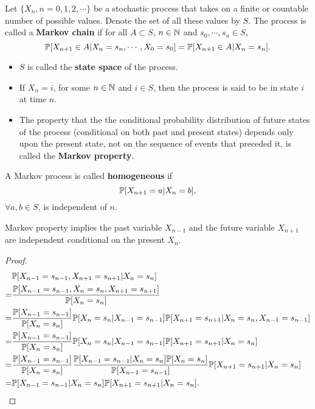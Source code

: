 \begin{definition}
    Let $\{X_n, n = 0, 1, 2, \cdots\}$ be a stochastic process that takes on a finite or countable number of possible values. Denote the set of all these values by $S$. The process is called a \textbf{Markov chain} if for all $A \subset S$, $n \in \mathbb{N}$ and $s_0, \cdots, s_n \in S$,
    $$\mathbb{P}[X_{n+1} \in A | X_n = s_n, \cdots, X_0 = s_0] = \mathbb{P}[X_{n+1} \in A | X_n = s_n].$$
\end{definition}

\begin{itemize}
    \item $S$ is called the \textbf{state space} of the process.
    \item If $X_n = i$, for some $n \in \mathbb{N}$ and $i \in S$, then the process is said to be in state $i$ at time $n$.
    \item The property that the the conditional probability distribution of future states of the process (conditional on both past and present states) depends only upon the present state, not on the sequence of events that preceded it, is called the \textbf{Markov property}.
\end{itemize}

\begin{definition}[Homogeneity]
    A Markov process is called \textbf{homogeneous} if 
    $$\mathbb{P}[X_{n+1} = a | X_n = b],$$
    $\forall a, b \in S$, is independent of $n$.
\end{definition}

\begin{theorem}
    Markov property implies the past variable $X_{n-1}$ and the future variable $X_{n+1}$ are independent conditional on the present $X_n$.
    \begin{proof}
        \begin{align*}
            & \mathbb{P}[X_{n-1} = s_{n-1}, X_{n+1} = s_{n+1} | X_n = s_n] \\ 
            = & \frac{\mathbb{P}[X_{n-1} = s_{n-1}, X_n = s_n, X_{n+1} = s_{n+1}]}{\mathbb{P}[ X_n = s_n]} \\ 
            = & \frac{\mathbb{P}[X_{n-1} = s_{n-1}]}{\mathbb{P}[ X_n = s_n]}  \mathbb{P}[X_n = s_n| X_{n-1} = s_{n-1}]  \mathbb{P} [X_{n+1} = s_{n+1} | X_n = s_n, X_{n-1} = s_{n-1}] \\ 
            = & \frac{\mathbb{P}[X_{n-1} = s_{n-1}]}{\mathbb{P}[ X_n = s_n]}  \mathbb{P}[X_n = s_n| X_{n-1} = s_{n-1}]  \mathbb{P} [X_{n+1} = s_{n+1} | X_n = s_n] \\ 
            = &  \frac{\mathbb{P}[X_{n-1} = s_{n-1}]}{\mathbb{P}[ X_n = s_n]}  \frac{\mathbb{P}[X_{n-1} = s_{n-1} | X_n = s_n]  \mathbb{P}[X_n = s_n]}{\mathbb{P}[X_{n-1} = s_{n-1}]}  \mathbb{P} [X_{n+1} = s_{n+1} | X_n = s_n] \\ 
            = & \mathbb{P}[X_{n-1} = s_{n-1} | X_n = s_n]  \mathbb{P} [X_{n+1} = s_{n+1} | X_n = s_n].
        \end{align*}
    \end{proof}
\end{theorem}

